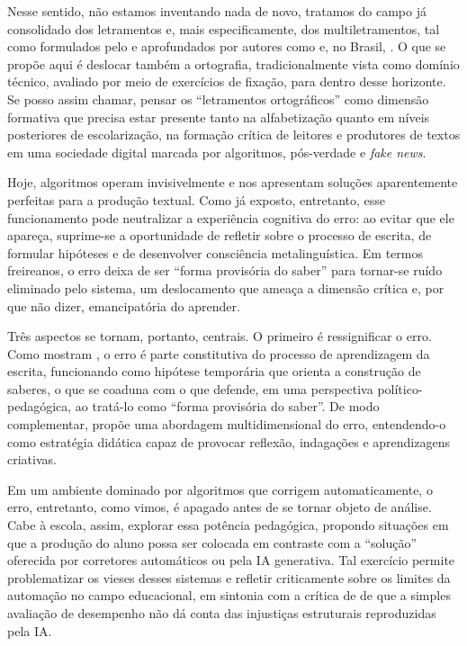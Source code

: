 \documentclass[portuguese]{textolivre}
\begin{document}
Nesse sentido, não estamos inventando nada de novo, tratamos do campo já consolidado dos letramentos \cite{soares1986letramento,street1995social} e, mais especificamente, dos multiletramentos, tal como formulados pelo \textcite{newlondongroup1996multiliteracies} e aprofundados por autores como \textcite{kalantzis2005learning} e, no Brasil, \textcite{rojo2009letramentos,rojo2012multiletramentos}. O que se propõe aqui é deslocar também a ortografia, tradicionalmente vista como domínio técnico, avaliado por meio de exercícios de fixação, para dentro desse horizonte. Se posso assim chamar, pensar os “letramentos ortográficos” como dimensão formativa que precisa estar presente tanto na alfabetização quanto em níveis posteriores de escolarização, na formação crítica de leitores e produtores de textos em uma sociedade digital marcada por algoritmos, pós-verdade e \textit{fake news}.

Hoje, algoritmos operam invisivelmente e nos apresentam soluções aparentemente perfeitas \cite{gillespie2014algorithms} para a produção textual. Como já exposto, entretanto, esse funcionamento pode neutralizar a experiência cognitiva do erro: ao evitar que ele apareça, suprime-se a oportunidade de refletir sobre o processo de escrita, de formular hipóteses e de desenvolver consciência metalinguística. Em termos freireanos, o erro deixa de ser “forma provisória do saber” \cite{freire1987pedagogia} para tornar-se ruído eliminado pelo sistema, um deslocamento que ameaça a dimensão crítica e, por que não dizer, emancipatória do aprender.

Três aspectos se tornam, portanto, centrais. O primeiro é ressignificar o erro. Como mostram \textcite{ferreiro1985psicogenese}, o erro é parte constitutiva do processo de aprendizagem da escrita, funcionando como hipótese temporária que orienta a construção de saberes, o que se coaduna com o que \textcite{freire1987pedagogia} defende, em uma perspectiva político-pedagógica, ao tratá-lo como “forma provisória do saber”. De modo complementar, \textcite{delatorre2007aprender} propõe uma abordagem multidimensional do erro, entendendo-o como estratégia didática capaz de provocar reflexão, indagações e aprendizagens criativas.

Em um ambiente dominado por algoritmos que corrigem automaticamente, o erro, entretanto, como vimos, é apagado antes de se tornar objeto de análise. Cabe à escola, assim, explorar essa potência pedagógica, propondo situações em que a produção do aluno possa ser colocada em contraste com a “solução” oferecida por corretores automáticos ou pela IA generativa. Tal exercício permite problematizar os vieses desses sistemas e refletir criticamente sobre os limites da automação no campo educacional, em sintonia com a crítica de \textcite{madaio2021beyondfairness} de que a simples avaliação de desempenho não dá conta das injustiças estruturais reproduzidas pela IA.
\end{document}
